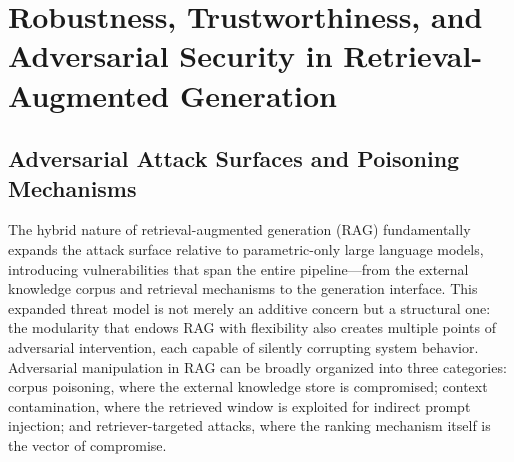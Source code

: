 \documentclass[11pt,a4paper]{article}
\begin{document}
\section{Robustness, Trustworthiness, and Adversarial Security in Retrieval-Augmented Generation}



\subsection{Adversarial Attack Surfaces and Poisoning Mechanisms}


The hybrid nature of retrieval-augmented generation (RAG) fundamentally expands the attack surface relative to parametric-only large language models, introducing vulnerabilities that span the entire pipeline---from the external knowledge corpus and retrieval mechanisms to the generation interface. This expanded threat model is not merely an additive concern but a structural one: the modularity that endows RAG with flexibility also creates multiple points of adversarial intervention, each capable of silently corrupting system behavior. Adversarial manipulation in RAG can be broadly organized into three categories: corpus poisoning, where the external knowledge store is compromised; context contamination, where the retrieved window is exploited for indirect prompt injection; and retriever-targeted attacks, where the ranking mechanism itself is the vector of compromise.
\end{document}
